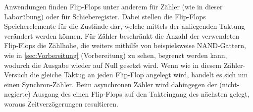 Anwendungen finden Flip-Flops unter anderem für Zähler (wie in dieser
Laborübung) oder für Schieberegister. Dabei stellen die Flip-Flops
Speicherelemente für die Zustände dar, welche mittels der
anliegenden Taktung
verändert werden können. Für Zähler beschränkt die Anzahl der verwendeten Flip-Flops 
die Zählhohe, die weiters mithilfe von beispielsweise NAND-Gattern, wie in \autoref{sec:Vorbereitung}
(Vorbereitung) zu sehen, begrenzt werden kann, wodurch die Ausgabe wieder auf Null gesetzt wird.
Wenn wie in diesem Zähler-Versuch die gleiche Taktug an jeden Flip-Flop angelegt wird, handelt
es sich um einen Synchron-Zähler. Beim asynchronen Zähler wird dahingegen der (nicht-negierte) Ausgang
des einen Flip-Flops auf den Takteingang des nächsten gelegt, woraus Zeitverzögerungen
resultieren.

